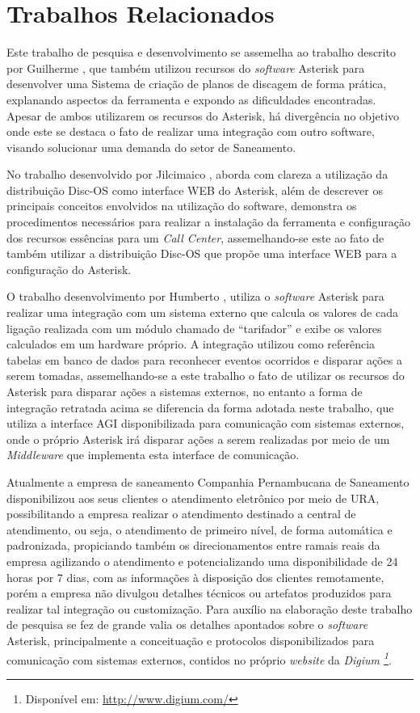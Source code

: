 \section{Trabalhos Relacionados}
Este trabalho de pesquisa e desenvolvimento se assemelha ao trabalho descrito por Guilherme \cite{VIEIRA:2007}, que também utilizou recursos do \textit{software} Asterisk para desenvolver uma Sistema de criação de planos de discagem de forma prática, explanando aspectos da ferramenta e expondo as dificuldades encontradas. Apesar de ambos utilizarem os recursos do Asterisk, há divergência no objetivo onde este se destaca o fato de realizar uma integração com outro software, visando solucionar uma demanda do setor de Saneamento.

No trabalho desenvolvido por Jilcimaico \cite{DARU:2008}, aborda com clareza a utilização da distribuição Disc-OS como interface WEB do Asterisk, além de descrever os principais conceitos envolvidos na utilização do software, demonstra os procedimentos necessários para realizar a instalação da ferramenta e configuração dos recursos essências para um \textit{Call Center}, assemelhando-se este ao fato de também utilizar a distribuição Disc-OS que propõe uma interface WEB para a configuração do Asterisk.

O trabalho desenvolvimento por Humberto \cite{CAMPOS:2007}, utiliza o \textit{software} Asterisk para realizar uma integração com um sistema externo que calcula os valores de cada ligação realizada com um módulo chamado de “tarifador” e exibe os valores calculados em um hardware próprio. A integração utilizou como referência tabelas em banco de dados para reconhecer eventos ocorridos e disparar ações a serem tomadas, assemelhando-se a este trabalho o fato de utilizar os recursos do Asterisk para disparar ações a sistemas externos, no entanto a forma de integração retratada acima se diferencia da forma adotada neste trabalho, que utiliza a interface AGI disponibilizada para comunicação com sistemas externos, onde o próprio Asterisk irá disparar ações a serem realizadas por meio de um \textit{Middleware} que implementa esta interface de comunicação.

Atualmente a empresa de saneamento Companhia Pernambucana de Saneamento \cite{COMPESA:URA} disponibilizou aos seus clientes o atendimento eletrônico por meio de URA, possibilitando a empresa realizar o atendimento destinado a central de atendimento, ou seja, o atendimento de primeiro nível, de forma automática e padronizada, propiciando também os direcionamentos entre ramais reais da empresa agilizando o atendimento e potencializando uma disponibilidade de 24 horas por 7 dias, com as informações à disposição dos clientes remotamente, porém a empresa não divulgou detalhes técnicos ou artefatos produzidos para realizar tal integração ou customização.
Para auxílio na elaboração deste trabalho de pesquisa se fez de grande valia os detalhes apontados sobre o \textit{software} Asterisk, principalmente a conceituação e protocolos disponibilizados para comunicação com sistemas externos, contidos no próprio \textit{website} da \textit{Digium \footnote{Disponível em: \url{http://www.digium.com/}}}. 
